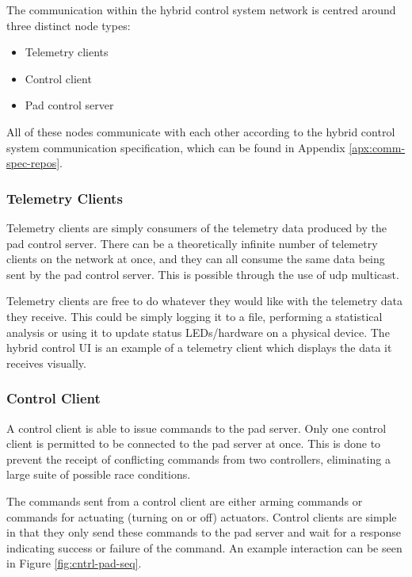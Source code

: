 The communication within the hybrid control system network is centred around three distinct node types:

\begin{itemize}
    \item Telemetry clients
    \item Control client
    \item Pad control server
\end{itemize}

All of these nodes communicate with each other according to the hybrid control system communication specification,
which can be found in Appendix \ref{apx:comm-spec-repos}.

\subsubsection{Telemetry Clients}

Telemetry clients are simply consumers of the telemetry data produced by the pad control server. There can be a
theoretically infinite number of telemetry clients on the network at once, and they can all consume the same data being
sent by the pad control server. This is possible through the use of \gls{udp} multicast.

Telemetry clients are free to do whatever they would like with the telemetry data they receive. This could be simply
logging it to a file, performing a statistical analysis or using it to update status LEDs/hardware on a physical
device. The hybrid control UI is an example of a telemetry client which displays the data it receives visually.

\subsubsection{Control Client}

A control client is able to issue commands to the pad server. Only one control client is permitted to be connected to
the pad server at once. This is done to prevent the receipt of conflicting commands from two controllers, eliminating a
large suite of possible race conditions.

The commands sent from a control client are either arming commands or commands for actuating (turning on or off)
actuators. Control clients are simple in that they only send these commands to the pad server and wait for a response
indicating success or failure of the command. An example interaction can be seen in Figure \ref{fig:cntrl-pad-seq}.

